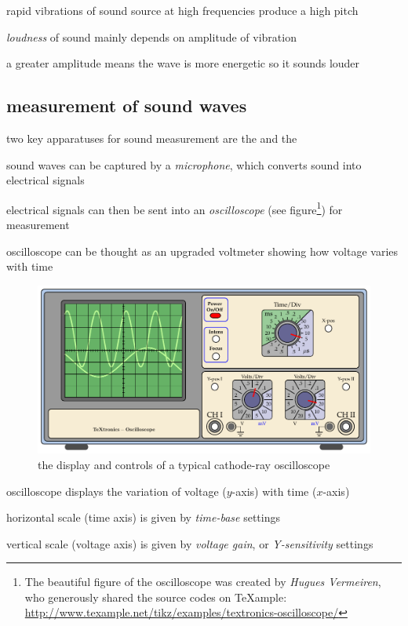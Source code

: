 rapid vibrations of sound source at high frequencies produce a high pitch

\cmt \emph{loudness} of sound mainly depends on amplitude of vibration

a greater amplitude means the wave is more energetic so it sounds louder
	

\subsection*{measurement of sound waves}

two key apparatuses for sound measurement are the  and the  

sound waves can be captured by a \emph{microphone}, which converts sound into electrical signals

electrical signals can then be sent into an \emph{oscilloscope} (see figure\footnote{The beautiful figure of the oscilloscope was created by \emph{Hugues Vermeiren}, who generously shared the source codes on TeXample: \url{http://www.texample.net/tikz/examples/textronics-oscilloscope/}}) for measurement

oscilloscope can be thought as an upgraded voltmeter showing how voltage varies with time

\begin{figure}[ht]
	\centering
	\includegraphics{oscilloscope.pdf}
	\caption{the display and controls of a typical cathode-ray oscilloscope}
\end{figure}

\cmt oscilloscope displays the variation of voltage ($y$-axis) with time ($x$-axis)

\cmt horizontal scale (time axis) is given by \emph{time-base} settings

vertical scale (voltage axis) is given by \emph{voltage gain}, or \emph{Y-sensitivity} settings

